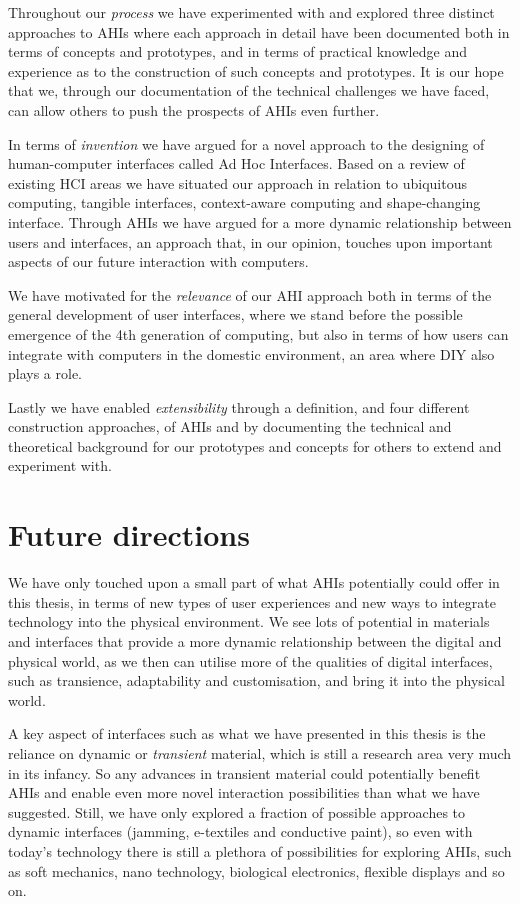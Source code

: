 Throughout our \emph{process} we have experimented with and explored three distinct approaches to AHIs where each approach in detail have been documented both in terms of concepts and prototypes, and in terms of practical knowledge and experience as to the construction of such concepts and prototypes.
It is our hope that we, through our documentation of the technical challenges we have faced, can allow others to push the prospects of AHIs even further.

In terms of \emph{invention} we have argued for a novel approach to the designing of human-computer interfaces called Ad Hoc Interfaces.
Based on a review of existing HCI areas we have situated our approach in relation to ubiquitous computing, tangible interfaces, context-aware computing and shape-changing interface.
Through AHIs we have argued for a more dynamic relationship between users and interfaces, an approach that, in our opinion, touches upon important aspects of our future interaction with computers.

We have motivated for the \emph{relevance} of our AHI approach both in terms of the general development of user interfaces, where we stand before the possible emergence of the 4th generation of computing, but also in terms of how users can integrate with computers in the domestic environment, an area where DIY also plays a role.

Lastly we have enabled \emph{extensibility} through a definition, and four different construction approaches, of AHIs and by documenting the technical and theoretical background for our prototypes and concepts for others to extend and experiment with.

\section{Future directions}
We have only touched upon a small part of what AHIs potentially could offer in this thesis, in terms of new types of user experiences and new ways to integrate technology into the physical environment.
We see lots of potential in materials and interfaces that provide a more dynamic relationship between the digital and physical world, as we then can utilise more of the qualities of digital interfaces, such as transience, adaptability and customisation, and bring it into the physical world.

A key aspect of interfaces such as what we have presented in this thesis is the reliance on dynamic or \emph{transient} material, which is still a research area very much in its infancy.
So any advances in transient material could potentially benefit AHIs and enable even more novel interaction possibilities than what we have suggested.
Still, we have only explored a fraction of possible approaches to dynamic interfaces (jamming, e-textiles and conductive paint), so even with today's technology there is still a plethora of possibilities for exploring AHIs, such as soft mechanics, nano technology, biological electronics, flexible displays and so on.

